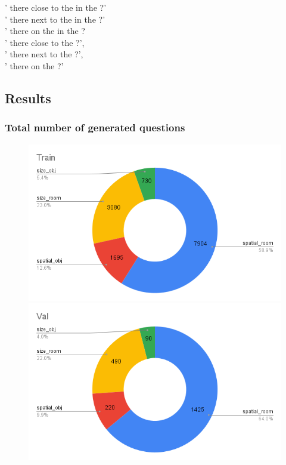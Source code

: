 ' there   close to the  in the ?'\\
' there    next to the  in the ?' \\
'  there   on the  in the ?\\
' there   close to the ?',\\
'  there   next to the  ?',\\
'  there   on the ?'


\subsection{Results}

\subsubsection{Total number of generated questions}

\begin{figure}[H]
\includegraphics[scale=0.25]{images/GenTrain.png}
\includegraphics[scale=0.25]{images/GenVal.png}
\label{fig:questionGen}
\end{figure}

